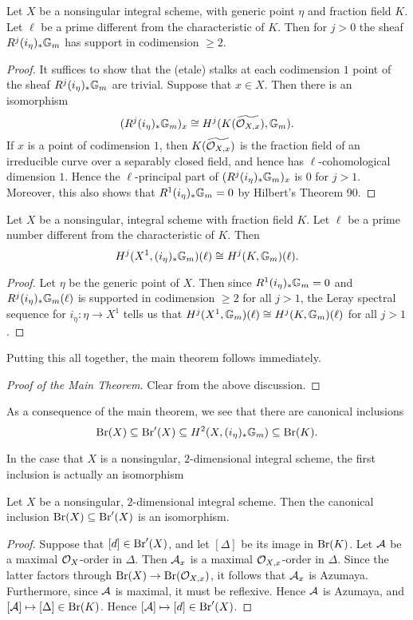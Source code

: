 \begin{lem}
Let $X$ be a nonsingular integral scheme, with generic point $\eta$ and fraction field $K$.  Let $\ell$ be a prime different from the characteristic of $K$.  Then for $j>0$ the sheaf $R^j(i_\eta)_*\mathbb{G}_m$ has support in codimension $\geq 2$.
\end{lem}
\begin{proof}
It suffices to show that the (etale) stalks at each codimension $1$ point of the sheaf $R^j(i_\eta)_*\mathbb{G}_m$ are trivial.  Suppose that $x\in X$.  Then there is an isomorphism
$$(R^j(i_\eta)_*\mathbb{G}_m)_x\cong H^j(K(\widetilde{\mathcal{O}_{X,x}}),\mathbb{G}_m).$$
If $x$ is a point of codimension $1$, then $K(\widetilde{\mathcal{O}_{X,x}})$ is the fraction field of an irreducible curve over a separably closed field, and hence has $\ell$-cohomological dimension $1$.  Hence the $\ell$-principal part of $(R^j(i_\eta)_*\mathbb{G}_m)_x$ is $0$ for $j>1$.  Moreover, this also shows that $R^1(i_\eta)_*\mathbb{G}_m = 0$ by Hilbert's Theorem 90.
\end{proof}

\begin{lem}
Let $X$ be a nonsingular, integral scheme with fraction field $K$.  Let $\ell$ be a prime number different from the characteristic of $K$.  Then
$$H^j(X^1,(i_\eta)_*\mathbb{G}_m)(\ell)\cong H^j(K,\mathbb{G}_m)(\ell).$$
\end{lem}
\begin{proof}
Let $\eta$ be the generic point of $X$.  Then since $R^1(i_\eta)_*\mathbb{G}_m = 0$ and $R^j(i_\eta)_*\mathbb{G}_m(\ell)$ is supported in codimension $\geq 2$ for all $j>1$, the Leray spectral sequence for $i_\eta: \eta\rightarrow X^1$ tells us that $H^j(X^1,\mathbb{G}_m)(\ell)\cong H^j(K,\mathbb{G}_m)(\ell)$ for all $j>1$.
\end{proof}

Putting this all together, the main theorem follows immediately.
\begin{proof}[Proof of the Main Theorem]
Clear from the above discussion.
\end{proof}

As a consequence of the main theorem, we see that there are canonical inclusions
$$\textnormal{Br}(X)\subseteq \textnormal{Br}'(X)\subseteq H^2(X,(i_\eta)_*\mathbb{G}_m)\subseteq \textnormal{Br}(K).$$

In the case that $X$ is a nonsingular, $2$-dimensional integral scheme, the first inclusion is actually an isomorphism
\begin{prop}
Let $X$ be a nonsingular, $2$-dimensional integral scheme.  Then the canonical inclusion $\textnormal{Br}(X)\subseteq \textnormal{Br}'(X)$ is an isomorphism.
\end{prop}
\begin{proof}
Suppose that $[d]\in \textnormal{Br}'(X)$, and let $[\Delta]$ be its image in $\textnormal{Br}(K)$.  Let $\mathcal{A}$ be a maximal $\mathcal{O}_X$-order in $\Delta$.  Then $\mathcal{A}_x$ is a maximal $\mathcal{O}_{X,x}$-order in $\Delta$.  Since the latter factors through $\textnormal{Br}(X)\rightarrow\textnormal{Br}(\mathcal{O}_{X,x})$, it follows that $\mathcal{A}_x$ is Azumaya.  Furthermore, since $\mathcal{A}$ is maximal, it must be reflexive.  Hence $\mathcal{A}$ is Azumaya, and $[\mathcal{A}]\mapsto [\Delta]\in \textnormal{Br}(K)$.  Hence $[\mathcal{A}]\mapsto [d]\in \textnormal{Br}'(X)$.
\end{proof}

